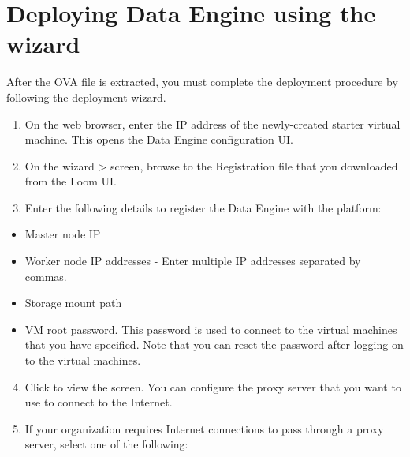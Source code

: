 \documentclass[letterpaper,10pt,english]{sphinxmanual}
\begin{document}
\chapter{Deploying Data Engine using the wizard}
\label{\detokenize{on_prem_dp_install_mcdmp:depl-dp-wizard}}\label{\detokenize{on_prem_dp_install_mcdmp:deploying-data-engine-using-the-wizard}}
After the OVA file is extracted, you must complete the deployment procedure by following the deployment wizard.

\begin{enumerate}
\item {} 
On the web browser, enter the IP address of the newly-created starter virtual machine. This opens the Data Engine configuration UI.

\item {} 
On the  wizard \textgreater{}  screen, browse to the Registration file that you downloaded from the Loom UI.

\item {} 
Enter the following details to register the Data Engine with the platform:

\end{enumerate}
\begin{itemize}
\item {} 
Master node IP

\item {} 
Worker node IP addresses - Enter multiple IP addresses separated by commas.

\item {} 
Storage mount path

\item {} 
VM root password. This password is used to connect to the virtual machines that you have specified. Note that you can reset the password after logging on to the virtual
machines.

\end{itemize}
\begin{enumerate}
\setcounter{enumi}{3}
\item {} 
Click  to view the  screen. You can configure the proxy server that you want to use to connect to the Internet.

\item {} 
If your organization requires Internet connections to pass through a proxy server, select one of the following:

\end{enumerate}
\end{document}
